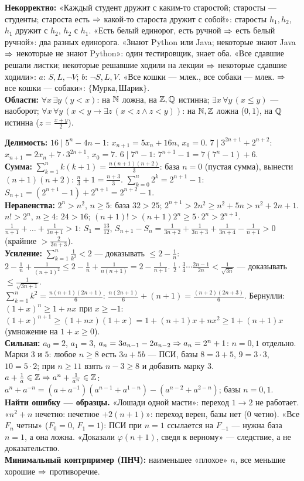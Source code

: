{\textbf{Некорректно:} «Каждый студент дружит с каким-то старостой; старосты — студенты; староста есть $\Rightarrow$ какой-то староста дружит с собой»: старосты $h_1,h_2$, $h_1$ дружит с $h_2$, $h_2$ с $h_1$. «Есть белый единорог, есть ручной $\Rightarrow$ есть белый ручной»: два разных единорога. «Знают Python или Java; некоторые знают Java $\Rightarrow$ некоторые не знают Python»: один тестировщик, знает оба. «Все сдавшие решали листки; некоторые решавшие ходили на лекции $\Rightarrow$ некоторые сдавшие ходили»: $a$: $S,L,\neg V$; $b$: $\neg S,L,V$. «Все кошки — млек., все собаки — млек. $\Rightarrow$ все кошки — собаки»: $\{\text{Мурка},\text{Шарик}\}$.\\
\textbf{Области:} $\forall x\,\exists y\,(y<x)$: на $\mathbb{N}$ ложна, на $\mathbb{Z},\mathbb{Q}$ истинна; $\exists x\,\forall y\,(x\le y)$ — наоборот; $\forall x\,\forall y\,(x<y\to\exists z\,(x<z\wedge z<y))$: на $\mathbb{N},\mathbb{Z}$ ложна ($0,1$), на $\mathbb{Q}$ истинна ($z=\frac{x+y}2$).

\textbf{Делимость:} $16\mid5^n-4n-1$: $x_{n+1}=5x_n+16n$, $x_0=0$. $7\mid3^{2n+1}+2^{n+2}$: $x_{n+1}=2x_n+7\cdot3^{2n+1}$, $x_0=7$. $6\mid7^n-1$: $7^{n+1}-1=7(7^n-1)+6$.\\
\textbf{Сумма:} $\sum_{k=1}^nk(k+1)=\frac{n(n+1)(n+2)}3$: база $n=0$ (пустая сумма), вынести $(n+1)(n+2)$: $\frac n3+1=\frac{n+3}3$. $\sum_{k=0}^n2^k=2^{n+1}-1$: $S_{n+1}=(2^{n+1}-1)+2^{n+1}=2^{n+2}-1$.\\
\textbf{Неравенства:} $2^n>n^2$, $n\ge5$: база $32>25$; $2^{n+1}>2n^2\ge n^2+5n>n^2+2n+1$. $n!>2^n$, $n\ge4$: $24>16$; $(n+1)!>(n+1)2^n\ge5\cdot2^n>2^{n+1}$. $\frac1{n+1}+\dots+\frac1{3n+1}>1$: $S_1=\frac{13}{12}$, $S_{n+1}-S_n=\frac1{3n+2}+\frac1{3n+3}+\frac1{3n+4}-\frac1{n+1}>0$ (крайние $>\frac2{3n+3}$).\\
\textbf{Усиление:} $\sum_{k=1}^n\frac1{k^2}<2$ — доказывать $\le2-\frac1n$: $2-\frac1n+\frac1{(n+1)^2}\le2-\frac1n+\frac1{n(n+1)}=2-\frac1{n+1}$. $\frac12\cdot\frac34\cdots\frac{2n-1}{2n}<\frac1{\sqrt{3n}}$ — доказывать $\le\frac1{\sqrt{3n+1}}$.\\
$\sum_{k=1}^nk^2=\frac{n(n+1)(2n+1)}6$: $\frac{n(2n+1)}6+(n+1)=\frac{(n+2)(2n+3)}6$. Бернулли: $(1+x)^n\ge1+nx$ при $x\ge-1$: $(1+x)^{n+1}\ge(1+nx)(1+x)=1+(n+1)x+nx^2\ge1+(n+1)x$ (умножение на $1+x\ge0$).\\
\textbf{Сильная:} $a_0=2$, $a_1=3$, $a_n=3a_{n-1}-2a_{n-2}\Rightarrow a_n=2^n+1$: $n=0,1$ отдельно. Марки $3$ и $5$: любое $n\ge8$ есть $3a+5b$ — ПСИ, базы $8=3+5$, $9=3\cdot3$, $10=5\cdot2$; при $n\ge11$ взять $n-3\ge8$ и добавить марку $3$. $a+\frac1a\in\mathbb{Z}\Rightarrow a^n+\frac1{a^n}\in\mathbb{Z}$: $a^n+a^{-n}=(a+a^{-1})(a^{n-1}+a^{1-n})-(a^{n-2}+a^{2-n})$; базы $n=0,1$.\\
\textbf{Найти ошибку — образцы.} «Лошади одной масти»: переход $1\to2$ не работает. «$n^2+n$ нечетно: нечетное $+2(n+1)$»: переход верен, базы нет ($0$ четно). «Все $F_n$ четны» ($F_0=0$, $F_1=1$): ПСИ при $n=1$ ссылается на $F_{-1}$ — нужна база $n=1$, а она ложна. «Доказали $\varphi(n+1)$, сведя к верному» — следствие, а не доказательство.\\
\textbf{Минимальный контрпример (ПНЧ):} наименьшее «плохое» $n$, все меньшие хорошие $\Rightarrow$ противоречие.

}
